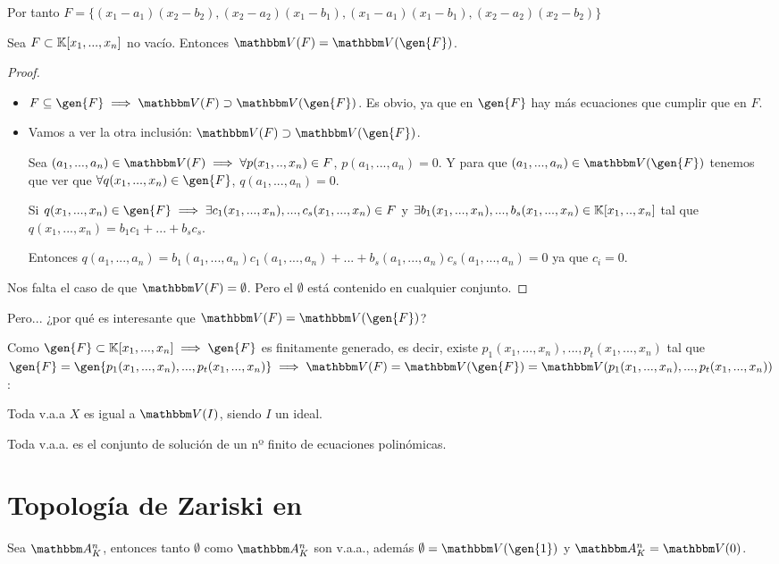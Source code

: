 \begin{example}
\begin{enumerate}
		Por tanto $F=\{ (x_1-a_1)(x_2-b_2), (x_2-a_2)(x_1-b_1), (x_1-a_1)(x_1-b_1), (x_2-a_2)(x_2-b_2)  \}$
	\end{enumerate}
\end{example}


\begin{prop}
	Sea $F \subset \mathbb{K}[x_1,...,x_n]$ no vacío. Entonces $\V(F)=\V(\gen{F})$.
\end{prop}

\begin{proof}
	\begin{itemize}
		\item $F \subseteq \gen{F} \implies \V(F) \supset \V(\gen{F})$. Es obvio, ya que en $\gen{F}$ hay más ecuaciones que cumplir que en $F$.
		\item Vamos a ver la otra inclusión: $\V(F) \supset \V(\gen{F})$.

		Sea $(a_1,...,a_n) \in \V(F) \implies \forall p(x_1,..,x_n) \in F$, $p(a_1,...,a_n)=0$. Y para que $(a_1,...,a_n) \in \V(\gen{F})$ tenemos que ver que $\forall q(x_1,...,x_n)\in \gen{F}$, $q(a_1,...,a_n)=0$.

		Si $q(x_1,...,x_n)\in \gen{F} \implies \exists c_1(x_1,...,x_n),...,c_s(x_1,...,x_n) \in F$ y $\exists b_1(x_1,...,x_n),...,b_s(x_1,...,x_n) \in \mathbb{K}[x_1,..,x_n]$ tal que $q(x_1,...,x_n)=b_1c_1+...+b_sc_s$.

		Entonces $q(a_1,...,a_n)=b_1(a_1,...,a_n)c_1(a_1,...,a_n)+...+b_s(a_1,...,a_n)c_s(a_1,...,a_n) = 0$  ya que $c_i=0$.
	\end{itemize}

	Nos falta el caso de que $\V(F)=\emptyset$. Pero el $\emptyset$ está contenido en cualquier conjunto.
\end{proof}

Pero... ¿por qué es interesante que $\V(F)=\V(\gen{F})$?

Como $\gen{F}\subset \K[x_1,...,x_n] \implies \gen{F}$ es finitamente generado, es decir, existe $p_1(x_1,...,x_n),...,p_t(x_1,...,x_n)$ tal que $\gen{F} = \gen{p_1(x_1,...,x_n),...,p_t(x_1,...,x_n)} \implies \V(F)=\V(\gen{F})=\V(p_1(x_1,...,x_n),...,p_t(x_1,...,x_n))$:

\obs Toda v.a.a $X$ es igual a $\V(I)$, siendo $I$ un ideal.

\obs Toda v.a.a. es el conjunto de solución de un nº finito de ecuaciones polinómicas.

\section{Topología de Zariski en \Akn}
Sea $\Akn$, entonces tanto $\emptyset$ como $\Akn$ son v.a.a., además $\emptyset=\V(\gen{1})$ y $\Akn=\V(0)$.


